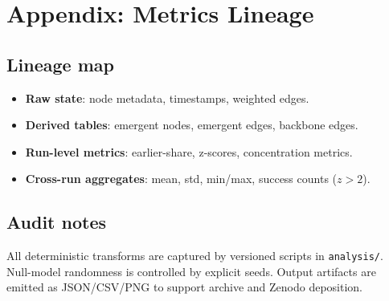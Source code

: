 \section{Appendix: Metrics Lineage}
\subsection{Lineage map}
\begin{itemize}[leftmargin=*]
  \item \textbf{Raw state}: node metadata, timestamps, weighted edges.
  \item \textbf{Derived tables}: emergent nodes, emergent edges, backbone edges.
  \item \textbf{Run-level metrics}: earlier-share, z-scores, concentration metrics.
  \item \textbf{Cross-run aggregates}: mean, std, min/max, success counts ($z>2$).
\end{itemize}

\subsection{Audit notes}
All deterministic transforms are captured by versioned scripts in \texttt{analysis/}. Null-model randomness is controlled by explicit seeds. Output artifacts are emitted as JSON/CSV/PNG to support archive and Zenodo deposition.
